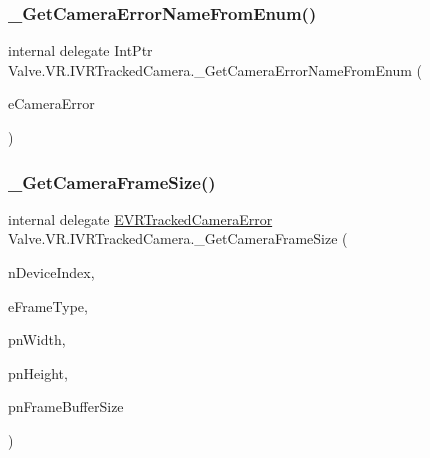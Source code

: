 \mbox{\label{struct_valve_1_1_v_r_1_1_i_v_r_tracked_camera_a0bf8d42b5ed4c30eb09d04124dfb621e}} 
\subsubsection{\texorpdfstring{\_GetCameraErrorNameFromEnum()}{\_GetCameraErrorNameFromEnum()}}
{\footnotesize\ttfamily internal delegate Int\+Ptr Valve.\+V\+R.\+I\+V\+R\+Tracked\+Camera.\+\_\+\+Get\+Camera\+Error\+Name\+From\+Enum (\begin{DoxyParamCaption}\item[{\mbox{\hyperlink{namespace_valve_1_1_v_r_ad0e012e846f5d93848783c044614cfd3}{E\+V\+R\+Tracked\+Camera\+Error}}}]{e\+Camera\+Error }\end{DoxyParamCaption})}

\mbox{\label{struct_valve_1_1_v_r_1_1_i_v_r_tracked_camera_a7a7151ceb5ce18c098884b07ba847502}} 
\subsubsection{\texorpdfstring{\_GetCameraFrameSize()}{\_GetCameraFrameSize()}}
{\footnotesize\ttfamily internal delegate \mbox{\hyperlink{namespace_valve_1_1_v_r_ad0e012e846f5d93848783c044614cfd3}{E\+V\+R\+Tracked\+Camera\+Error}} Valve.\+V\+R.\+I\+V\+R\+Tracked\+Camera.\+\_\+\+Get\+Camera\+Frame\+Size (\begin{DoxyParamCaption}\item[{uint}]{n\+Device\+Index,  }\item[{\mbox{\hyperlink{namespace_valve_1_1_v_r_a9962211bc3fe98c2683db188c12c9afd}{E\+V\+R\+Tracked\+Camera\+Frame\+Type}}}]{e\+Frame\+Type,  }\item[{ref uint}]{pn\+Width,  }\item[{ref uint}]{pn\+Height,  }\item[{ref uint}]{pn\+Frame\+Buffer\+Size }\end{DoxyParamCaption})}


